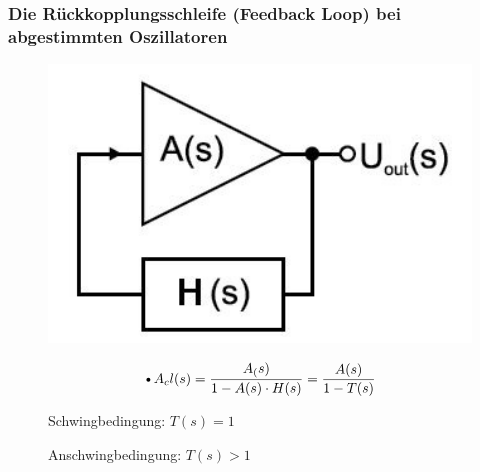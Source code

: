 \subsubsection{Die Rückkopplungsschleife (Feedback Loop) bei abgestimmten Oszillatoren}
\begin{figure}[h!]
	\begin{minipage}{0.3\textwidth} 
	  \includegraphics[width=1.0\textwidth]{images/Blockdiagramm_Oszillator}
	\end{minipage}
	\begin{minipage}{0.4\textwidth}
	  \begin{equation*}
        \text{\textbullet }A_cl(s) =\frac{A_(s)}{1-A(s) \cdot H(s)} = \frac{A(s)}{1-T(s)}
      \end{equation*}
      \begin{compactitem}
        \item Schwingbedingung: $T(s)=1$\\
        \item Anschwingbedingung: $T(s)>1$\\ 
      \end{compactitem}
	\end{minipage}
\end{figure}
\raggedright

\FloatBarrier
